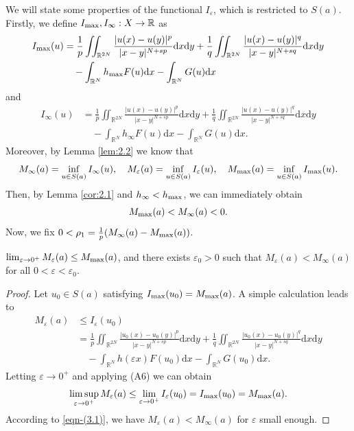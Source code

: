 \documentclass[reqno]{amsart}
\begin{document}
We will state some properties of the functional $I_{\varepsilon}$,
which is restricted to $S(a)$.
Firstly, we define $I_{\rm max},I_\infty:X\to \mathbb{R}$ as
\begin{align*}
I_{\rm max}(u)
&= \frac{1}{p}\iint_{\mathbb{R}^{2N}}\frac{|u(x)
 -u(y)|^{p}}{|x-y|^{N+sp}}\mathrm{d}x\mathrm{d}y
  +\frac{1}{q}\iint_{\mathbb{R}^{2N}}\frac{|u(x)-u(y)|^{q}}{|x-y|^{N+sq}}\mathrm{d}x\mathrm{d}y\\
&\quad -\int_{\mathbb{R}^N}h_{\rm max}F(u)\mathrm{d}x
 -\int_{\mathbb{R}^N}G(u)\mathrm{d}x
\end{align*}
and
\begin{align*}
I_\infty(u)
&= \frac{1}{p}\iint_{\mathbb{R}^{2N}}\frac{|u(x)-u(y)|^{p}}
 {|x-y|^{N+sp}}\mathrm{d}x\mathrm{d}y+\frac{1}{q}
 \iint_{\mathbb{R}^{2N}}\frac{|u(x)-u(y)|^{q}}{|x-y|^{N+sq}}\mathrm{d}x\mathrm{d}y\\
&\quad -\int_{\mathbb{R}^N}h_{\infty}F(u)\mathrm{d}x
-\int_{\mathbb{R}^N}G(u)\mathrm{d}x.
\end{align*}
Moreover, by Lemma \ref{lem:2.2} we know that
$$ 
M_\infty(a)=\inf_{u\in S(a)}I_\infty(u),\quad
M_\varepsilon(a)=\inf_{u\in S(a)}I_\varepsilon(u),\quad
M_{\rm max}(a)=\inf_{u\in S(a)}I_{\rm max}(u).
$$
Then, by Lemma \ref{cor:2.1} and $h_\infty<h_{\rm max}$, we can immediately obtain
\begin{equation}\label{eqn-(3.1)}
M_{\rm max}(a)<M_\infty(a)<0.
\end{equation}
Now, we fix $0<\rho_1=\frac{1}{p}(M_\infty(a)-M_{\rm max}(a))$.

\begin{lemma}\label{lem:3.1}
 $\lim_{\varepsilon\to 0^{+}}  M_\varepsilon(a)\le M_{\rm max}(a)$, and there exists 
 $\varepsilon_0>0$ such that $M_\varepsilon(a)<M_\infty(a)$ for all 
 $0<\varepsilon<\varepsilon_0$.
\end{lemma}

\begin{proof} 
Let $u_0\in S(a)$ satisfying $I_{\rm max}(u_0)=M_{\rm max}(a)$.
A simple calculation leads to
\begin{align*}
M_\varepsilon(a)&\leq  I_\varepsilon(u_0)\\
&= \frac{1}{p}\iint_{\mathbb{R}^{2N}}\frac{|u_0(x)-u_0(y)|^{p}}{|x-y|^{N+sp}}
 \mathrm{d}x\mathrm{d}y+\frac{1}{q}\iint_{\mathbb{R}^{2N}}
 \frac{|u_0(x)-u_0(y)|^{q}}{|x-y|^{N+sq}}\mathrm{d}x\mathrm{d}y\\
&\quad -\int_{\mathbb{R}^N}h(\varepsilon x)F(u_0)\mathrm{d}x
 -\int_{\mathbb{R}^N}G(u_0)\mathrm{d}x.
\end{align*}
Letting $\varepsilon\to 0^{+}$ and applying (A6) we can obtain
$$
\limsup\limits_{\varepsilon\to 0^{+}} M_ \varepsilon (a)
\le\lim_{\varepsilon\to 0^{+}}I_\varepsilon(u_0)=I_{\rm max}(u_0)=M_{\rm max}(a).
$$
According to \eqref{eqn-(3.1)}, we have $M_{\varepsilon}(a)<M_{\infty}(a)$ for 
$\varepsilon$ small enough.
\end{proof}
\end{document}
